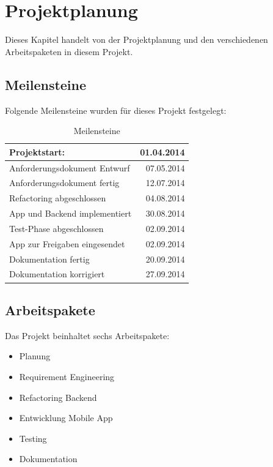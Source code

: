 %
%

\chapter{Projektplanung}\label{chap.projektplanung}

Dieses Kapitel handelt von der Projektplanung und den verschiedenen Arbeitspaketen in diesem Projekt.

\section{Meilensteine}\label{meilensteine}

Folgende Meilensteine wurden für dieses Projekt festgelegt:

\begin{table}[ht]
\centering
  \begin{tabular}{ l | r }
	\hline
	\rowcolor{gray}
	Projektstart:					&	01.04.2014	\\ \hline
	Anforderungsdokument Entwurf		&	07.05.2014	\\ \hline
	Anforderungsdokument fertig		&	12.07.2014	\\ \hline
	Refactoring abgeschlossen		&	04.08.2014	\\ \hline
	App und Backend implementiert		& 	30.08.2014	\\ \hline
	Test-Phase abgeschlossen			&	02.09.2014	\\ \hline
	App zur Freigaben eingesendet		&	02.09.2014	\\ \hline
	Dokumentation fertig			&	20.09.2014	\\ \hline
	Dokumentation korrigiert			&	27.09.2014	\\ \hline
  \end{tabular}
   \caption{Meilensteine}\label{table:milestones}
\end{table}

\section{Arbeitspakete}\label{arbeitspakete}
Das Projekt beinhaltet sechs Arbeitspakete:
\begin{itemize}
\item Planung
\item Requirement Engineering
\item Refactoring Backend
\item Entwicklung Mobile App
\item Testing
\item Dokumentation
\end{itemize}

